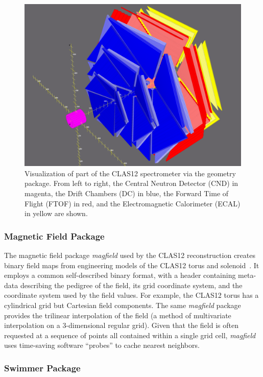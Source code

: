 \begin{figure}
\centering
\includegraphics[width=1.0\columnwidth]{pics/detectorview.png}
\caption{Visualization of part of the CLAS12 spectrometer via the geometry package. From left to right, the Central
  Neutron Detector (CND) in magenta, the Drift Chambers (DC) in blue, the Forward Time of Flight (FTOF) in red,
  and the Electromagnetic Calorimeter (ECAL) in yellow are shown.}
\label{fig:detectorview}
\end{figure}

\subsubsection{Magnetic Field Package}

The magnetic field package {\it magfield} used by the CLAS12 reconstruction creates binary field maps from
engineering models of the CLAS12 torus and solenoid~\cite{magnets-nim}. It employs a common self-described
binary format, with a header containing meta-data describing the pedigree of the field, its grid coordinate system,
and the coordinate system used by the field values. For example, the CLAS12 torus has a cylindrical grid but
Cartesian field components. The same {\it magfield} package provides the trilinear interpolation of the field (a
method of multivariate interpolation on a 3-dimensional regular grid). Given that the field is often requested at a
sequence of points all contained within a single grid cell, {\it magfield} uses time-saving software “probes” to cache
nearest neighbors.

\subsubsection{Swimmer Package}

